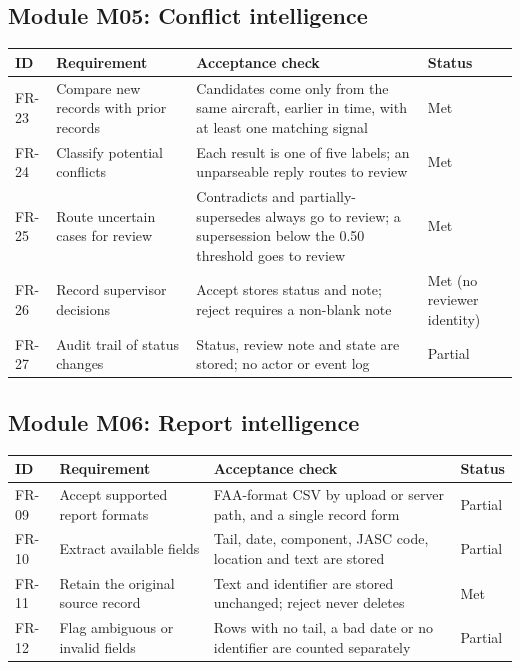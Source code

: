 \subsection{Module M05: Conflict intelligence}
\begin{longtable}{p{}p{}p{}p{}}
\toprule \textbf{ID} & \textbf{Requirement} & \textbf{Acceptance check} & \textbf{Status} \\ \midrule \endhead
FR-23 & Compare new records with prior records & Candidates come only from the same aircraft, earlier in time, with at least one matching signal & Met \\
FR-24 & Classify potential conflicts & Each result is one of five labels; an unparseable reply routes to review & Met \\
FR-25 & Route uncertain cases for review & Contradicts and partially-supersedes always go to review; a supersession below the 0.50 threshold goes to review & Met \\
FR-26 & Record supervisor decisions & Accept stores status and note; reject requires a non-blank note & Met (no reviewer identity) \\
FR-27 & Audit trail of status changes & Status, review note and state are stored; no actor or event log & Partial \\
\bottomrule
\end{longtable}

\subsection{Module M06: Report intelligence}
\begin{longtable}{p{}p{}p{}p{}}
\toprule \textbf{ID} & \textbf{Requirement} & \textbf{Acceptance check} & \textbf{Status} \\ \midrule \endhead
FR-09 & Accept supported report formats & FAA-format CSV by upload or server path, and a single record form & Partial \\
FR-10 & Extract available fields & Tail, date, component, JASC code, location and text are stored & Partial \\
FR-11 & Retain the original source record & Text and identifier are stored unchanged; reject never deletes & Met \\
FR-12 & Flag ambiguous or invalid fields & Rows with no tail, a bad date or no identifier are counted separately & Partial \\
\bottomrule
\end{longtable}

